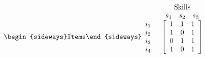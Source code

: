 \documentclass{beamer}
\begin{document}
\begin{frame}
\begin{overprint}
\begin{columns}
\begin{column}{0.4\textwidth}
{$\begin{array}{c}
\begin{array}{cc}
 & \textrm{Skills}\\
 & \begin{array}{ccc}
s_{1} & s_{2} & s_{3}\end{array}\\
\mathrm{\begin{sideways}Items\end{sideways}}\begin{array}{c}
i_{1}\\
i_{2}\\
i_{3}\\
i_{4}
\end{array} & \left[\begin{array}{ccc}
1 & 1 & 1\\
1 & 0 & 1\\
0 & 1 & 1\\
1 & 0 & 1
\end{array}\right]
\end{array}\\
\\
\\

\end{array}$
	      }
	      
	      \end{column}
	     \end{columns}
\end{overprint}
\end{frame}

\newcommand{\tabitem}{~~\llap{\textbullet}~~}
\newcommand\VRule[1][\arrayrulewidth]{\vrule width #1}
\end{document}

